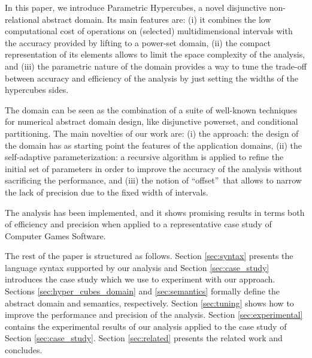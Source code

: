 In this paper, we introduce Parametric Hypercubes, a novel disjunctive non-relational abstract domain. Its main features are: (i) it combines the low computational cost of operations on (selected) multidimensional intervals with the accuracy provided by lifting to a power-set domain, (ii) the compact representation of its elements allows to limit the space complexity of the analysis, and (iii) the parametric nature of the domain provides a way to tune the trade-off between accuracy and efficiency of the analysis by just setting the widths of the hypercubes sides. 

The domain can be seen as the combination of a suite of well-known techniques for numerical abstract domain design, like disjunctive powerset, and conditional partitioning. The main novelties of our work are: 
(i) the approach: the design of the domain has as starting point the features of the application domains, (ii) the self-adaptive parameterization: a recursive algorithm is applied to refine the initial set of parameters in order to improve the accuracy of the analysis without sacrificing the performance, and (iii) the notion of \textquotedblleft offset\textquotedblright\ that allows to narrow the lack of precision due to the fixed width of intervals.

The analysis has been implemented, and it shows promising results in terms both of efficiency and precision when applied to a representative case study of Computer Games Software. 

The rest of the paper is structured as follows. Section \ref{sec:syntax} presents the language syntax supported by our analysis and Section \ref{sec:case_study} introduces the case study which we use to experiment with our approach. Sections \ref{sec:hyper_cubes_domain} and \ref{sec:semantics} formally define the abstract domain and semantics, respectively. Section \ref{sec:tuning} shows how to improve the performance and precision of the analysis. Section \ref{sec:experimental} contains the experimental results of our analysis applied to the case study of Section \ref{sec:case_study}. Section \ref{sec:related} presents the related work and concludes.

